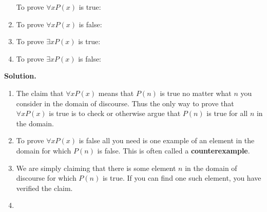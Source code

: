 \documentclass[10pt,]{book}
\newcommand{\terminology}[1]{\textbf{#1}}
\theoremstyle{plain}
\theoremstyle{definition}
\theoremstyle{definition}
\numberwithin{equation}{chapter}
\begin{document}
\begin{exerciselist}
\begin{enumerate}[label=(\alph*)]
To prove \(\forall x P(x)\) is true:%
\par
\hypertarget{p-259}{}%
\par
\begin{itemize}[label=$\odot$,leftmargin=3em,]
\end{itemize}
%
\item\hypertarget{li-134}{}\hypertarget{p-260}{}%
To prove \(\forall x P(x)\) is false:%
\par
\hypertarget{p-261}{}%
\par
\begin{itemize}[label=$\odot$,leftmargin=3em,]
\end{itemize}
%
\item\hypertarget{li-135}{}\hypertarget{p-262}{}%
To prove \(\exists x P(x)\) is true:%
\par
\hypertarget{p-263}{}%
\par
\begin{itemize}[label=$\odot$,leftmargin=3em,]
\end{itemize}
%
\item\hypertarget{li-136}{}\hypertarget{p-264}{}%
To prove \(\exists x P(x)\) is false:%
\par
\hypertarget{p-265}{}%
\par
\begin{itemize}[label=$\odot$,leftmargin=3em,]
\end{itemize}
%
\end{enumerate}
%
\par
\medskip\noindent%
\textbf{Solution.}\quad \hypertarget{p-266}{}%
\leavevmode%
\begin{enumerate}[label=(\alph*)]
\item\hypertarget{li-137}{}\hypertarget{p-267}{}%
The claim that \(\forall x P(x)\) means that \(P(n)\) is true no matter what \(n\) you consider in the domain of discourse.  Thus the only way to prove that \(\forall x P(x)\) is true is to check or otherwise argue that \(P(n)\) is true for all \(n\) in the domain.%
\item\hypertarget{li-138}{}\hypertarget{p-268}{}%
To prove \(\forall x P(x)\) is false all you need is one example of an element in the domain for which \(P(n)\) is false.  This is often called a \terminology{counterexample}.%
\item\hypertarget{li-139}{}\hypertarget{p-269}{}%
We are simply claiming that there is some element \(n\) in the domain of discourse for which \(P(n)\) is true.  If you can find one such element, you have verified the claim.%
\item\hypertarget{li-140}{}\hypertarget{p-270}{}%

\end{enumerate}
\end{exerciselist}
\end{document}
